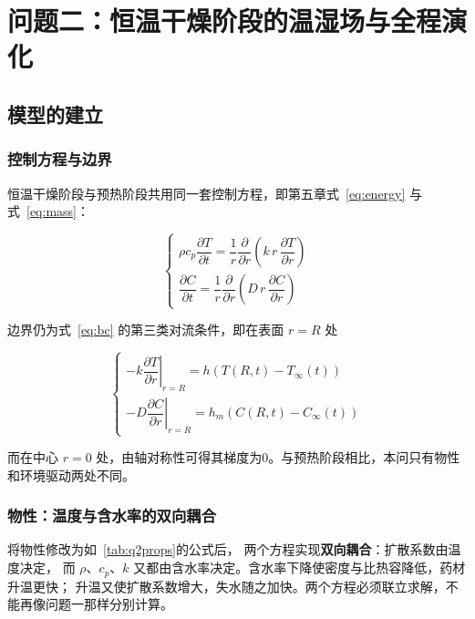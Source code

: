 \section{问题二：恒温干燥阶段的温湿场与全程演化}

\subsection{模型的建立}

\subsubsection{控制方程与边界}

恒温干燥阶段与预热阶段共用同一套控制方程，即第五章式~\eqref{eq:energy} 与式~\eqref{eq:mass}：

\[
\begin{cases}
\rho c_p\dfrac{\partial T}{\partial t}
  =\dfrac{1}{r}\dfrac{\partial}{\partial r}\left(k\,r\,\dfrac{\partial T}{\partial r}\right)\\[16pt]
\dfrac{\partial C}{\partial t}
  =\dfrac{1}{r}\dfrac{\partial}{\partial r}\left(D\,r\,\dfrac{\partial C}{\partial r}\right)
\end{cases}
\]

边界仍为式~\eqref{eq:bc} 的第三类对流条件，即在表面 $r=R$ 处

\[
\begin{cases}
-k\left.\dfrac{\partial T}{\partial r}\right|_{r=R}
  =h\left(T(R,t)-T_\infty(t)\right)\\[16pt]
-D\left.\dfrac{\partial C}{\partial r}\right|_{r=R}
  =h_m\left(C(R,t)-C_\infty(t)\right)
\end{cases}
\]

而在中心 $r=0$ 处，由轴对称性可得其梯度为0。与预热阶段相比，本问只有物性和环境驱动两处不同。

\subsubsection{物性：温度与含水率的双向耦合}

将物性修改为如~\ref{tab:q2props}的公式后，
两个方程实现\textbf{双向耦合}：扩散系数由温度决定，
而 $\rho$、$c_p$、$k$ 又都由含水率决定。含水率下降使密度与比热容降低，药材升温更快；
升温又使扩散系数增大，失水随之加快。两个方程必须联立求解，不能再像问题一那样分别计算。


